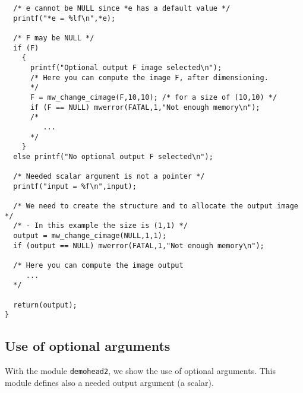 {\begin{verbatim}
  /* e cannot be NULL since *e has a default value */
  printf("*e = %lf\n",*e);

  /* F may be NULL */
  if (F)
    {
      printf("Optional output F image selected\n");
      /* Here you can compute the image F, after dimensioning.  
      */      
      F = mw_change_cimage(F,10,10); /* for a size of (10,10) */
      if (F == NULL) mwerror(FATAL,1,"Not enough memory\n");
      /*
         ...
      */
    }
  else printf("No optional output F selected\n");

  /* Needed scalar argument is not a pointer */
  printf("input = %f\n",input);

  /* We need to create the structure and to allocate the output image */
  /* - In this example the size is (1,1) */  
  output = mw_change_cimage(NULL,1,1);
  if (output == NULL) mwerror(FATAL,1,"Not enough memory\n");

  /* Here you can compute the image output 
     ...
  */  

  return(output);
}
\end{verbatim} %
}

\subsection{Use of optional arguments}
\label{header_examples_optarg}

With the module \verb+demohead2+, we show the use of optional arguments.
This module defines also a needed output argument (a scalar).

